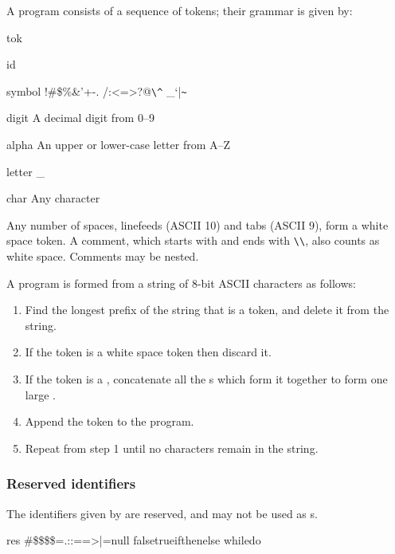 \documentclass[english]{article}
\begin{document}
A program consists of a sequence of tokens; their grammar is given by:

\begin{bnfc}
\item[tok]\Alt{}\Alt{}
\item[id]\lbrac{}\alt{}\rbrac\closure\Alt
  \pclosure
\item[symbol]!\Alt \#\Alt \$\Alt \%\Alt \&\Alt '\Alt *\Alt +\Alt -\Alt .%
\Alt /\Alt :\Alt<\Alt =\Alt >\Alt ?\Alt @\Alt \verb|\|\Alt \verb|^|\Alt%
\_\Alt`\Alt|\Alt\verb|~|
\item[digit]\textrm{A decimal digit from 0--9}
\item[alpha]\textrm{An upper or lower-case letter from A--Z}
\item[letter]\Alt\_
\item[char]\textrm{Any character}
\end{bnfc}

Any number of spaces, linefeeds (ASCII 10) and tabs (ASCII 9), form a
white space token. A comment, which starts with \conc{//} and ends
with \verb|\\|, also counts as white space. Comments may be nested.

A program is formed from a string of 8-bit ASCII characters as
follows:

\begin{enumerate}
\item Find the longest prefix of the string that is a token, and
  delete it from the string.
\item If the token is a white space token then discard it.
\item If the token is a , concatenate all the
  s which form it together to form one large
  .
\item Append the token to the program.
\item Repeat from step 1 until no characters remain in the string.
\end{enumerate}

\subsubsection{Reserved identifiers}

The identifiers given by  are reserved, and may not be used
as s.

\begin{bnfc}
\item[res]\#\Alt\$\Alt\$\$\Alt\$=\Alt.\Alt:\Alt:=\Alt=>\Alt|=\Alt null\Alt
false\Alt true\Alt if\Alt then\Alt else \Alt while\Alt do
\end{bnfc}
\end{document}
